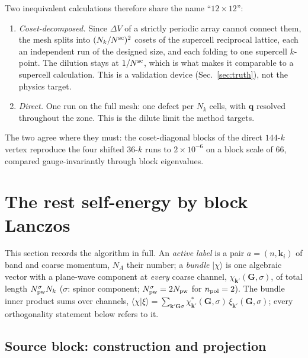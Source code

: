 \documentclass[aps,prx,reprint,superscriptaddress,nofootinbib,longbibliography]{revtex4-2}
\newcommand{\dV}{\Delta V}
\newcommand{\kk}{\mathbf{k}}
\newcommand{\qq}{\mathbf{q}}
\newcommand{\GG}{\mathbf{G}}
\begin{document}
Two inequivalent calculations therefore share the name ``$12\times12$'':
\begin{enumerate}
\item[(a)] \emph{Coset-decomposed.} Since $\dV$ of a strictly periodic array
cannot connect them, the mesh splits into $(N_k/N^{\rm sc})^2$ cosets of the
supercell reciprocal lattice, each an independent run of the designed size, and
each folding to one supercell $k$-point. The dilution stays at $1/N^{\rm sc}$,
which is what makes it comparable to a supercell calculation. This is a
validation device (Sec.~\ref{sec:truth}), not the physics target.
\item[(b)] \emph{Direct.} One run on the full mesh: one defect per $N_k$ cells,
with $\qq$ resolved throughout the zone. This is the dilute limit the method
targets.
\end{enumerate}
The two agree where they must: the coset-diagonal blocks of the direct
$144$-$k$ vertex reproduce the four shifted $36$-$k$ runs to $2\times10^{-6}$
on a block scale of $66$, compared gauge-invariantly through block eigenvalues.


\section{The rest self-energy by block Lanczos}
\label{sec:lanczos}

This section records the algorithm in full. An \emph{active label} is a pair
$a=(n,\kk_i)$ of band and coarse momentum, $N_A$ their number; a
\emph{bundle} $|\chi\rangle$ is one algebraic vector with a plane-wave
component at \emph{every} coarse channel, $\chi_{\kk'}(\GG,\sigma)$, of total
length $N^{\sigma}_{\rm pw}N_k$ ($\sigma$: spinor component;
$N^{\sigma}_{\rm pw}=2N_{\rm pw}$ for $n_{\rm pol}=2$). The bundle inner
product sums over channels,
$\langle\chi|\xi\rangle=\sum_{\kk'\GG\sigma}
\chi^{*}_{\kk'}(\GG,\sigma)\,\xi_{\kk'}(\GG,\sigma)$;
every orthogonality statement below refers to it.

\subsection{Source block: construction and projection}
\end{document}
